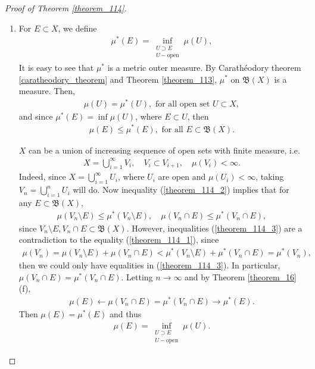 \documentclass[11pt]{book}
\theoremstyle{definition}
\numberwithin{equation}{chapter}
\begin{document}
\begin{proof}[Proof of Theorem \ref{theorem_114}]
~\begin{enumerate}[label=(\alph*)]
    \item For $E \subset X$, we define
    \begin{align*}
        \mu^*(E) = \inf_{\substack{U \supset E\\ U - \text{open}}} \mu(U),
    \end{align*}
    It is easy to see that $\mu^*$ is a metric outer measure. By Carathéodory theorem \ref{caratheodory_theorem} and Theorem \ref{theorem_113}, $\mu^*$ on $\mathfrak{B}(X)$ is a measure. Then, 
    \begin{align}\label{theorem_114_1}
        \mu(U) = \mu^*(U), \,\, \text{for all open set} \,\, U \subset X,
    \end{align}
    and since $\mu^*(E) = \inf \mu(U)$, where $E \subset U$, then
    \begin{align}\label{theorem_114_2}
        \mu(E) \leq \mu^*(E), \,\, \text{for all} \,\, E \subset \mathfrak{B}(X).
    \end{align}

    $X$ can be a union of increasing sequence of open sets with finite measure, i.e. 
    \begin{align*}
        X = \bigcup^\infty_{i=1} V_i, \quad V_i \subset V_{i+1}, \quad \mu(V_i) < \infty.
    \end{align*}
    Indeed, since $X = \bigcup^\infty_{i=1} U_i$, where $U_i$ are open and $\mu(U_i) < \infty$, taking $V_n = \bigcup^n_{i=1} U_i$ will do. Now inequality (\ref{theorem_114_2}) implies that for any $E \subset \mathfrak{B}(X)$,
    \begin{align}\label{theorem_114_3}
        \mu(V_n \setminus E) \leq \mu^*(V_n \setminus E), \quad \mu(V_n \cap E) \leq \mu^*(V_n \cap E),
    \end{align}
    since $V_n \setminus E, V_n \cap E \subset \mathfrak{B}(X)$. However, inequalities (\ref{theorem_114_3}) are a contradiction to the equality (\ref{theorem_114_1}), since 
    \begin{align*}
        \mu(V_n) = \mu(V_n \setminus E) + \mu(V_n \cap E) < \mu^*(V_n \setminus E) + \mu^*(V_n \cap E) = \mu^*(V_n),
    \end{align*}
    then we could only have equalities in (\ref{theorem_114_3}). In particular, $\mu(V_n \cap E) = \mu^*(V_n \cap E)$. Letting $n \to \infty$ and by Theorem \ref{theorem_16}(f), 
    \begin{align*}
        \mu(E) \leftarrow \mu(V_n \cap E) = \mu^*(V_n \cap E) \rightarrow \mu^*(E).
    \end{align*}
    Then $\mu(E) = \mu^*(E)$ and thus
    \begin{align*}
        \mu(E) = \inf_{\substack{U \supset E\\ U - \text{open}}} \mu(U).
    \end{align*}
    

\end{enumerate}
\end{proof}
\end{document}
